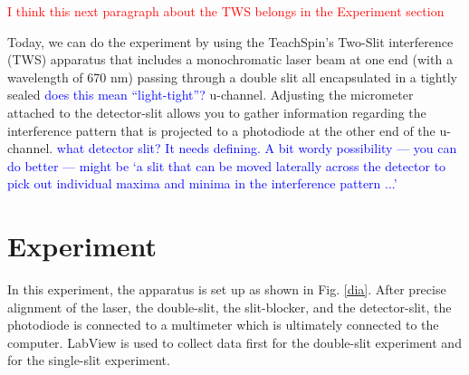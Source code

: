 \documentclass[prb,preprint]{revtex4-1}
\begin{document}
\textcolor{red}{I think this next paragraph about the TWS belongs in the Experiment section}


Today, we can do the experiment by using the TeachSpin's Two-Slit interference (TWS) apparatus that includes a monochromatic laser beam at one end (with a wavelength of 670 nm) passing through a double slit all encapsulated in a tightly sealed \textcolor{blue}{does this mean ``light-tight''?} u-channel. Adjusting the micrometer attached to the detector-slit allows you to gather information regarding the interference pattern that is projected to a photodiode at the other end of the u-channel. \textcolor{blue}{what detector slit? It needs defining. A bit wordy possibility --- you can do better --- might be `a slit that can be moved laterally across the detector to pick out individual maxima and minima in the interference pattern ...'}

\section{Experiment}
In this experiment, the apparatus is set up as shown in Fig. \ref{dia}. After precise alignment of the laser, the double-slit, the slit-blocker, and the detector-slit, the photodiode is connected to a multimeter which is ultimately connected to the computer. LabView is used to collect data first for the double-slit experiment and for the single-slit experiment. \\
\end{document}
